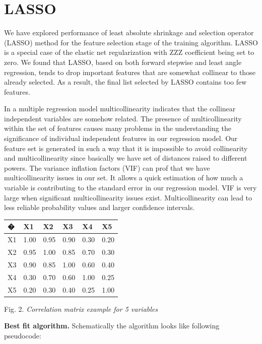 \documentclass[aps,prl,reprint,amsmath,amssymb,nature]{revtex4-1}
\begin{document}
\section{LASSO} 

We have explored performance of least absolute 
shrinkage and selection operator (LASSO) method for the feature 
selection stage of the training algorithm. LASSO is a special case of 
the elastic net regularization with ZZZ coefficient being set to zero. 
We found that LASSO, based on both forward stepwise and least angle 
regression, tends to drop important features that are somewhat collinear 
to those already selected. As a result, the final list selected by LASSO 
contains too few features.

In a multiple regression model multicollinearity indicates that the 
collinear independent variables are somehow related. The presence of 
multicollinearity within the set of features causes many problems in the 
understanding the significance of individual independent features in our 
regression model. Our feature set is generated in such a way that it is 
impossible to avoid collinearity and multicollinearity since basically 
we have set of distances raised to different powers. The variance 
inflation factors (VIF) can prof that we have multicollinearity issues 
in our set. It allows a quick estimation of how much a variable is 
contributing to the standard error in our regression model. VIF is very 
large when significant multicollinearity issues exist. Multicollinearity 
can lead to less reliable probability values and larger confidence 
intervals.

\begin{table}[h]
\centering
\begin{tabular}{|l|l|l|l|l|l|}
\hline
� & X1 & X2 & X3 & X4 & X5 \\
\hline
X1 & 1.00 & 0.95 & 0.90 & 0.30 & 0.20 \\
\hline
X2 & 0.95 & 1.00 & 0.85 & 0.70 & 0.30 \\
\hline
X3 & 0.90 & 0.85 & 1.00 & 0.60 & 0.40 \\
\hline
X4 & 0.30 & 0.70 & 0.60 & 1.00 & 0.25 \\
\hline
X5 & 0.20 & 0.30 & 0.40 & 0.25 & 1.00 \\
\hline
\end{tabular}
\end{table}


Fig. 2. \textit{Correlation matrix example for 5 variables}

\textbf{Best fit algorithm.} Schematically the algorithm looks like 
following pseudocode:
\end{document}
